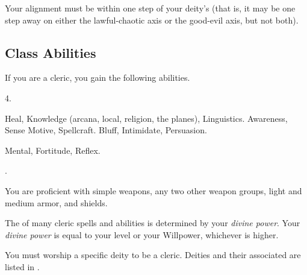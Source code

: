      Your alignment must be within one step of your deity's (that is, it may be one step away on either the lawful-chaotic axis or the good-evil axis, but not both).

    \subsection{Class Abilities}
        If you are a cleric, you gain the following abilities.

         4.

         Heal, Knowledge (arcana, local, religion, the planes), Linguistics.
         Awareness, Sense Motive, Spellcraft.
         Bluff, Intimidate, Persuasion.

          Mental,  Fortitude,  Reflex.

         .

        You are proficient with simple weapons, any two other weapon groups, light and medium armor, and shields.

        The  of many cleric spells and abilities is determined by your \textit{divine power}.
        Your \textit{divine power} is equal to your level or your Willpower, whichever is higher.

        You must worship a specific deity to be a cleric.
        Deities and their associated  are listed in .

